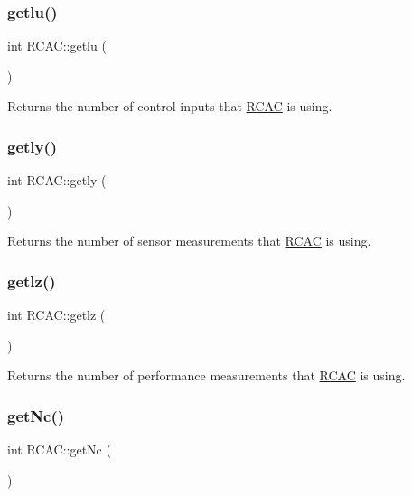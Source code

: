 \subsubsection{\texorpdfstring{getlu()}{getlu()}}
{\footnotesize\ttfamily int R\+C\+A\+C\+::getlu (\begin{DoxyParamCaption}{ }\end{DoxyParamCaption})\hspace{0.3cm}{\ttfamily [inline]}}

Returns the number of control inputs that \hyperlink{class_r_c_a_c}{R\+C\+AC} is using. \mbox{\label{class_r_c_a_c_a1066229fd21de368018ae43747f34622}} 
\subsubsection{\texorpdfstring{getly()}{getly()}}
{\footnotesize\ttfamily int R\+C\+A\+C\+::getly (\begin{DoxyParamCaption}{ }\end{DoxyParamCaption})\hspace{0.3cm}{\ttfamily [inline]}}

Returns the number of sensor measurements that \hyperlink{class_r_c_a_c}{R\+C\+AC} is using. \mbox{\label{class_r_c_a_c_a80a0a753247f22bea53bc5c0b76403a1}} 
\subsubsection{\texorpdfstring{getlz()}{getlz()}}
{\footnotesize\ttfamily int R\+C\+A\+C\+::getlz (\begin{DoxyParamCaption}{ }\end{DoxyParamCaption})\hspace{0.3cm}{\ttfamily [inline]}}

Returns the number of performance measurements that \hyperlink{class_r_c_a_c}{R\+C\+AC} is using. \mbox{\label{class_r_c_a_c_a5e3d7aedab3b39415315f1c6b1920ef0}} 
\subsubsection{\texorpdfstring{get\+Nc()}{getNc()}}
{\footnotesize\ttfamily int R\+C\+A\+C\+::get\+Nc (\begin{DoxyParamCaption}{ }\end{DoxyParamCaption})\hspace{0.3cm}{\ttfamily [inline]}}

